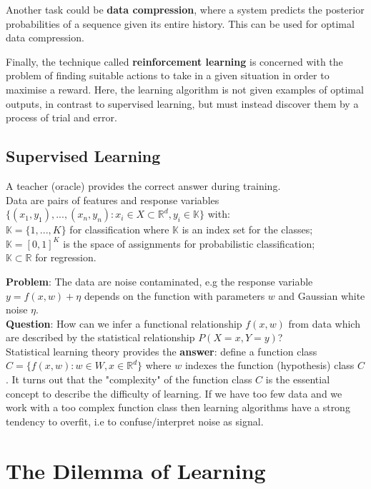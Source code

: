 \documentclass[twoside]{article}
\begin{document}
Another task could be \textbf{data compression}, where a system predicts the posterior probabilities of a sequence given its entire history. This can be used for optimal data compression.\medskip

Finally, the technique called \textbf{reinforcement learning} is concerned with the problem of finding suitable actions to take in a given situation in order to maximise a reward. Here, the learning algorithm is not given examples of optimal outputs, in contrast to supervised learning, but must instead discover them by a process of trial and error.

\subsection{Supervised Learning}

A teacher (oracle) provides the correct answer during training.\\
Data are pairs of features and response variables $\{(x_1, y_1), ..., (x_n, y_n) : x_i \in X \subset \mathbb{R}^d, y_i \in  \mathbb{K}\}$ with:\\
$\mathbb{K} = \{1,...,K\}$ for classification where $\mathbb{K}$ is an index set for the classes;\\
$\mathbb{K} = [0, 1]^K$ is the space of assignments for probabilistic classification;\\
$\mathbb{K} \subset \mathbb{R}$ for regression.\medskip

\textbf{Problem}: The data are noise contaminated, e.g the response variable $y = f(x,w) + \eta$ depends on the function with parameters $w$ and Gaussian white noise $\eta$.\\
\textbf{Question}: How can we infer a functional relationship $f(x, w)$ from data which are described by the statistical relationship $P(X = x, Y = y)$?\\
Statistical learning theory provides the \textbf{answer}: define a function class $C = \{f(x, w): w \in W, x \in \mathbb{R}^d\}$ where $w$ indexes the function (hypothesis) class $C$. It turns out that the "complexity" of the function class $C$ is the essential concept to describe the difficulty of learning. If we have too few data and we work with a too complex function class then learning algorithms have a strong tendency to overfit, i.e to confuse/interpret noise as signal.

\newpage

\section{The Dilemma of Learning}
\end{document}
